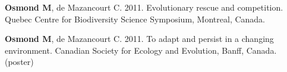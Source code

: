 \documentclass[12pt]{article}
\begin{document}
\textbf{Osmond M}, de Mazancourt C. 2011. Evolutionary rescue and competition. Quebec Centre for Biodiversity Science Symposium, Montreal, Canada.

\textbf{Osmond M}, de Mazancourt C. 2011. To adapt and persist in a changing environment. Canadian Society for Ecology and Evolution, Banff, Canada. (poster)








\end{document}
